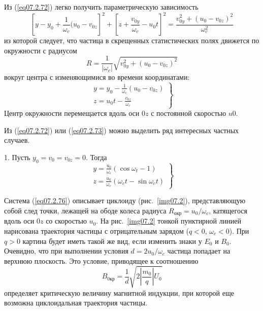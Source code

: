 Из (\ref{eq07.2.72}) легко получить параметрическую зависимость
\begin{equation}
	\left[ y - y_0 + \frac{1}{\omega_c}(u_0 - v_{0z} \right]^2 + 
		\left[ z + \frac{v_{0y}}{\omega_c} - u_0 t \right]^2 = 
		\frac{v^2_{0y} + (u_0 - v_{0z})^2}{\omega^2_c}
	\label{eq07.2.73}
\end{equation}
из которой следует, что частица в скрещенных статистических полях движется по 
окружности с радиусом
\begin{equation}
	R = \frac{1}{|\omega_c|}\sqrt{v^2_{0y}+(u_0 -v_{0z})^2}
	\label{eq07.2.74}
\end{equation}
вокруг центра с изменяющимися во времени координатами:
\begin{equation}
	\left. \begin{array}{c}
		y = y_0 - \frac{1}{\omega_c}(u_0 - v_{0z}) \\
		z = u_0 t - \frac{v_{0z}}{\omega_c}
	\end{array} \right\}
	\label{eq07.2.75}
\end{equation}
Центр окружности перемещается вдоль оси \( 0z \) с постоянной скоростью 
\( u0 \).

Из (\ref{eq07.2.72}) или (\ref{eq07.2.73}) можно выделить ряд интересных 
частных случаев. 

1. Пусть \( y_0 = v_0 = v_{0z} = 0 \). Тогда
\begin{equation}
	\left. \begin{array}{c}
		y = \frac{u_0}{\omega_c}(\cos\omega_t - 1) \\
		z = \frac{u_0}{\omega_c}(\omega_c t - \sin\omega_c t)
	\end{array} \right\}
	\label{eq07.2.76}
\end{equation}

Система (\ref{eq07.2.76})  описывает циклоиду  (рис.~\ref{img07.2}), 
представляющую собой след точки, лежащей на ободе колеса радиуса 
\( R_\text{окр} = u_0 / \omega_c \), катящегося вдоль оси \( 0z \) со 
скоростью \( u_0 \). На рис.~\ref{img07.2} тонкой пунктирной линией 
нарисована траектория частицы с отрицательным зарядом (\( q < 0 \), 
\( \omega_c < 0 \)). При \( q > 0 \) картина будет иметь такой же вид, если 
изменить знаки у \( E_0 \) и \( B_0 \). Очевидно, что при выполнении условия 
\( d = 2u_0/\omega_c \) частица попадает на верхнюю плоскость. Это условие, 
приводящее к соотношению
\[
	B_{0\text{кр}} = \frac{1}{d}\sqrt{2\left| \frac{m_0}{q} \right| U_0}
\]
определяет критическую величину магнитной индукции, при которой еще возможна 
циклоидальная траектория частицы.

